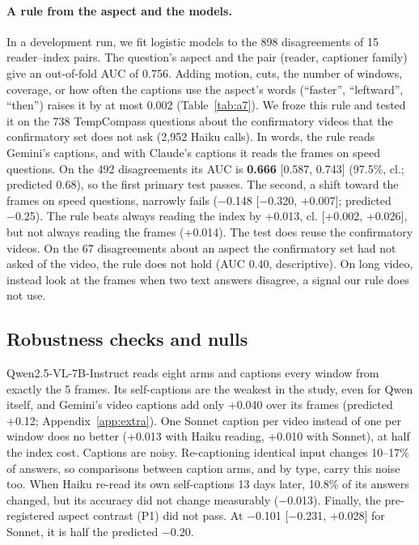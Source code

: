\documentclass[11pt]{article}
\newcommand{\cl}{cl.}
\begin{document}
\paragraph{A rule from the aspect and the models.} In a development run, we fit logistic models to the 898 disagreements of 15 reader--index pairs. The question's aspect and the pair (reader, captioner family) give an out-of-fold AUC of 0.756. Adding motion, cuts, the number of windows, coverage, or how often the captions use the aspect's words (``faster'', ``leftward'', ``then'') raises it by at most 0.002 (Table~\ref{tab:a7}). We froze this rule and tested it on the 738 TempCompass questions about the confirmatory videos that the confirmatory set does not ask (2,952 Haiku calls). In words, the rule reads Gemini's captions, and with Claude's captions it reads the frames on speed questions. On the 492 disagreements its AUC is \textbf{0.666} [0.587, 0.743] (97.5\%, \cl; predicted 0.68), so the first primary test passes. The second, a shift toward the frames on speed questions, narrowly fails (−0.148 [−0.320, +0.007]; predicted −0.25). The rule beats always reading the index by +0.013, \cl{} [+0.002, +0.026], but not always reading the frames (+0.014). The test does reuse the confirmatory videos. On the 67 disagreements about an aspect the confirmatory set had not asked of the video, the rule does not hold (AUC 0.40, descriptive). On long video, \citet{readfirst} instead look at the frames when two text answers disagree, a signal our rule does not use.

\subsection{Robustness checks and nulls}
\label{sec:robust}

Qwen2.5-VL-7B-Instruct reads eight arms and captions every window from exactly the 5 frames. Its self-captions are the weakest in the study, even for Qwen itself, and Gemini's video captions add only +0.040 over its frames (predicted +0.12; Appendix~\ref{app:extra}). One Sonnet caption per video instead of one per window does no better (+0.013 with Haiku reading, +0.010 with Sonnet), at half the index cost. Captions are noisy. Re-captioning identical input changes 10--17\% of answers, so comparisons between caption arms, and by type, carry this noise too. When Haiku re-read its own self-captions 13 days later, 10.8\% of its answers changed, but its accuracy did not change measurably (−0.013). Finally, the pre-registered aspect contrast (P1) did not pass. At −0.101 [−0.231, +0.028] for Sonnet, it is half the predicted −0.20.
\end{document}
